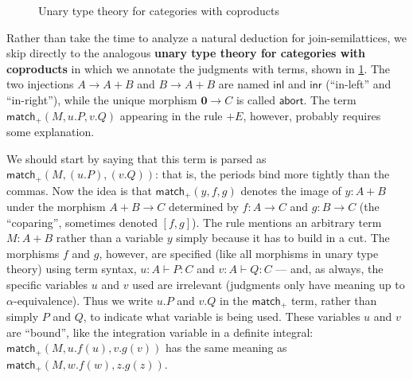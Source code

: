 \documentclass{book}
\def\idfunc{\mathsf{id}}
\let\types\vdash
\def\type{\;\ftype}
\def\plusE{\mathord{+}E}
\def\plusI{\mathord{+}I}
\def\inl{\mathsf{inl}}
\def\inr{\mathsf{inr}}
\def\case{\mathsf{match}_+}
\def\emptyt{\mathbf{0}}
\def\abort{\mathsf{abort}}
\begin{document}
\begin{figure}
  \centering
  \caption{Unary type theory for categories with coproducts}
  \label{fig:catcoprod}
\end{figure}

Rather than take the time to analyze a natural deduction for join-semilattices, we skip directly to the analogous \textbf{unary type theory for categories with coproducts} in which we annotate the judgments with terms, shown in \cref{fig:catcoprod}.
The two injections $A\to A+B$ and $B\to A+B$ are named $\inl$ and $\inr$ (``in-left'' and ``in-right''), while the unique morphism $\emptyt \to C$ is called $\abort$.
The term $\case(M,u.P,v.Q)$ appearing in the rule $\plusE$, however, probably requires some explanation.

We should start by saying that this term is parsed as $\case(M,(u.P),(v.Q))$: that is, the periods bind more tightly than the commas.
Now the idea is that $\case(y,f,g)$ denotes the image of $y:A+B$ under the morphism $A+B\to C$ determined by $f:A\to C$ and $g:B\to C$ (the ``coparing'', sometimes denoted $[f,g]$).
The rule mentions an arbitrary term $M:A+B$ rather than a variable $y$ simply because it has to build in a cut.
The morphisms $f$ and $g$, however, are specified (like all morphisms in unary type theory) using term syntax, $u:A\types P:C$ and $v:A\types Q:C$ --- and, as always, the specific variables $u$ and $v$ used are irrelevant (judgments only have meaning up to $\alpha$-equivalence).
Thus we write $u.P$ and $v.Q$ in the $\case$ term, rather than simply $P$ and $Q$, to indicate what variable is being used.
These variables $u$ and $v$ are ``bound'', like the integration variable in a definite integral: $\case(M,u.f(u),v.g(v))$ has the same meaning as $\case(M,w.f(w),z.g(z))$.
\end{document}
